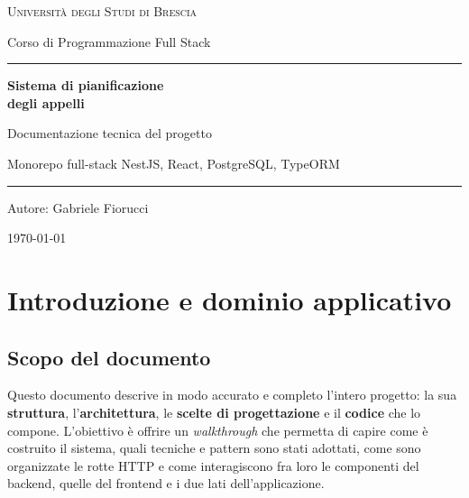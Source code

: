 \documentclass[11pt,a4paper,oneside]{report}
\begin{document}
\begin{titlepage}
  \centering
  \vspace*{2cm}
  {\Large\scshape Università degli Studi di Brescia\par}
  \vspace{0.3cm}
  {\large Corso di Programmazione Full Stack\par}
  \vspace{2.5cm}
  {\color{accent}\rule{\linewidth}{1.2pt}}\par
  \vspace{0.8cm}
  {\Huge\bfseries Sistema di pianificazione\\[0.2cm] degli appelli\par}
  \vspace{0.6cm}
  {\large Documentazione tecnica del progetto\par}
  \vspace{0.4cm}
  {\normalsize Monorepo full-stack \textemdash{} NestJS, React, PostgreSQL, TypeORM\par}
  \vspace{0.8cm}
  {\color{accent}\rule{\linewidth}{1.2pt}}\par
  \vfill
  {\large Autore: Gabriele Fiorucci\par}
  \vspace{0.3cm}
  {\normalsize \today\par}
\end{titlepage}

\tableofcontents
\thispagestyle{empty}

\chapter{Introduzione e dominio applicativo}

\section{Scopo del documento}
Questo documento descrive in modo accurato e completo l'intero progetto:
la sua \textbf{struttura}, l'\textbf{architettura}, le \textbf{scelte di
progettazione} e il \textbf{codice} che lo compone. L'obiettivo è offrire un
\emph{walkthrough} che permetta di capire come è costruito il sistema, quali
tecniche e pattern sono stati adottati, come sono organizzate le rotte HTTP e
come interagiscono fra loro le componenti del backend, quelle del frontend e i
due lati dell'applicazione.
\end{document}
